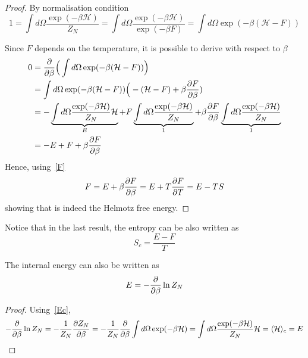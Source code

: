     \begin{proof}
        By normalisation condition 
        \begin{equation*}
            1 = \int d\Omega \frac{\exp(-\beta \mathcal H)}{Z_N} = \int d\Omega \frac{\exp(-\beta \mathcal H)}{\exp(-\beta F)} = \int d\Omega \exp (- \beta (\mathcal H - F))
        \end{equation*}

        Since $F$ depends on the temperature, it is possible to derive with respect to $\beta$
        \begin{equation*}
        \begin{aligned}
            0 & = \frac{\partial}{\partial\beta} \Big ( \int d\Omega \exp (- \beta (\mathcal H - F)) \Big) \\ & = \int d\Omega \exp (-\beta (\mathcal H - F)) \Big (-(\mathcal H - F) + \beta \frac{\partial F}{\partial\beta}) \\ & = - \underbrace{\int d\Omega \frac{\exp(-\beta \mathcal H)}{Z_N} \mathcal H}_{E} + F \underbrace{\int d\Omega \frac{\exp(-\beta \mathcal H)}{Z_N}}_{1} + \beta \frac{\partial F}{\partial\beta} \underbrace{\int d\Omega \frac{\exp(-\beta \mathcal H)}{Z_N}}_{1} \\ & = - E + F + \beta \frac{\partial F}{\partial\beta}
        \end{aligned}
        \end{equation*}
        Hence, using~\eqref{F}
        \begin{equation*}
            F = E + \beta \frac{\partial F}{\partial\beta} = E + T \frac{\partial F}{\partial T} = E - TS
        \end{equation*}
        showing that is indeed the Helmotz free energy.
    \end{proof}

    Notice that in the last result, the entropy can be also written as 
    \begin{equation} \label{Sc}
        S_c = \frac{E - F}{T}
    \end{equation}
    
    The internal energy can also be written as 
    \begin{equation*}
        E = - \frac{\partial}{\partial\beta} \ln Z_N
    \end{equation*}

    \begin{proof}
        Using~\eqref{Ec},
        \begin{equation*}
            - \frac{\partial}{\partial\beta} \ln Z_N = - \frac{1}{Z_N} \frac{\partial Z_N}{\partial\beta} = - \frac{1}{Z_N} \frac{\partial}{\partial\beta} \int d\Omega \exp (-\beta \mathcal H) = \int d\Omega \frac{\exp(-\beta \mathcal H)}{Z_N}  \mathcal H = \langle\mathcal H\rangle_{c} = E
        \end{equation*}
    \end{proof}

